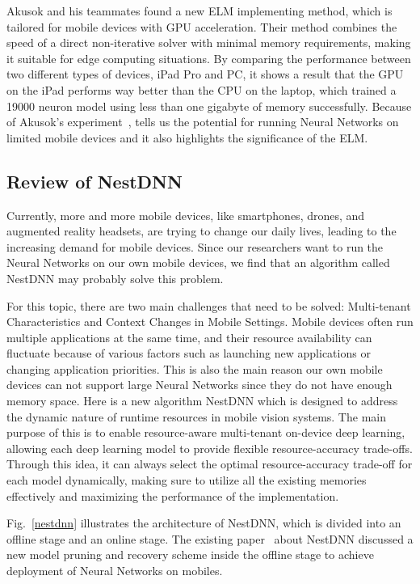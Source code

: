 \documentclass{article}
\begin{document}
Akusok and his teammates found a new ELM implementing method, which is tailored for mobile devices with GPU acceleration. Their method combines the speed of a direct non-iterative solver with minimal memory requirements, making it suitable for edge computing situations. By comparing the performance between two different types of devices, iPad Pro and PC, it shows a result that the GPU on the iPad performs way better than the CPU on the laptop, which trained a 19000 neuron model using less than one gigabyte of memory successfully. Because of Akusok’s experiment~\cite{akusok2019metal}, tells us the potential for running Neural Networks on limited mobile devices and it also highlights the significance of the ELM.

\subsection{Review of NestDNN}
Currently, more and more mobile devices, like smartphones, drones, and augmented reality headsets, are trying to change our daily lives, leading to the increasing demand for mobile devices. Since our researchers want to run the Neural Networks on our own mobile devices, we find that an algorithm called NestDNN may probably solve this problem. 

For this topic, there are two main challenges that need to be solved: Multi-tenant Characteristics and Context Changes in Mobile Settings. Mobile devices often run multiple applications at the same time, and their resource availability can fluctuate because of various factors such as launching new applications or changing application priorities. This is also the main reason our own mobile devices can not support large Neural Networks since they do not have enough memory space. Here is a new algorithm NestDNN which is designed to address the dynamic nature of runtime resources in mobile vision systems. The main purpose of this is to enable resource-aware multi-tenant on-device deep learning, allowing each deep learning model to provide flexible resource-accuracy trade-offs. Through this idea, it can always select the optimal resource-accuracy trade-off for each model dynamically, making sure to utilize all the existing memories effectively and maximizing the performance of the implementation.


Fig.~\ref{nestdnn} illustrates the architecture of NestDNN, which is divided into an offline stage and an online stage. The existing paper~\cite{fang2018nestdnn} about NestDNN discussed a new model pruning and recovery scheme inside the offline stage to achieve deployment of Neural Networks on mobiles. 
\end{document}
